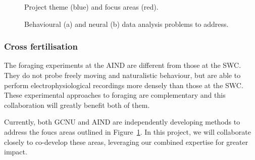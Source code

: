 \begin{figure}
    \begin{center}
        \resizebox{4.0in}{!}{%
            
        }
    \end{center}
    \caption{Project theme (blue) and focus areas (red).}
    \label{fig:focusAreas}
\end{figure}

\begin{figure}
    \centering
    \subfloat[]{
        \resizebox{3.0in}{!}{%
            
        }
    }
    \hfill
    \subfloat[]{
        \resizebox{2.25in}{!}{%
            
        }
    }
    \caption{Behavioural (a) and neural (b) data analysis problems to address.}
    \label{fig:dataAnalysis}
\end{figure}

\subsubsection{Cross fertilisation}

The foraging experiments at the AIND are different from those at
the SWC. They do not probe freely moving and naturalistic behaviour, but are
able to perform electrophysiological recordings more densely than those at the SWC.
%
These experimental approaches to foraging are complementary and this
collaboration will greatly benefit both of them.

Currently, both GCNU and AIND are independently developing methods to address the foucs areas outlined in Figure~\ref{fig:focusAreas}. In this project, we will collaborate closely to co-develop these areas, leveraging our combined expertise for greater impact.